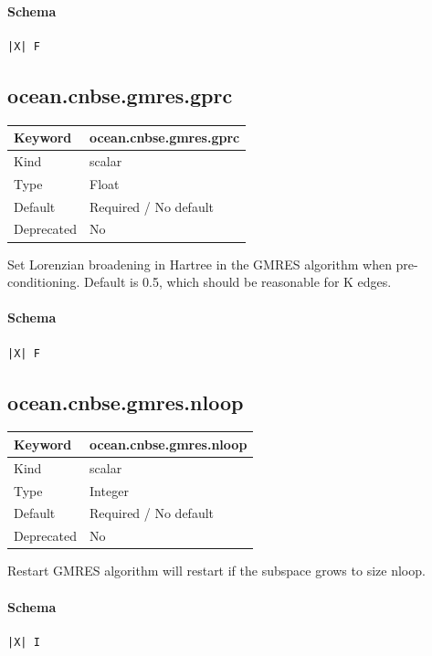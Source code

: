 \documentclass[11pt]{article}
\begin{document}
{{{{{\paragraph{Schema}
\begin{Verbatim}
|X| F
\end{Verbatim}

\subsection{ocean.cnbse.gmres.gprc}
\label{kw:ocean-cnbse-gmres-gprc}
\begin{longtable}{|p{1.5in}|p{4.5in}|}
\hline
Keyword & ocean.cnbse.gmres.gprc \\
\hline
Kind & scalar \\
\hline
Type & Float \\
\hline
Default & Required / No default \\
\hline
Deprecated & No \\
\hline
\end{longtable}
 Set Lorenzian broadening in Hartree in the GMRES algorithm when
 pre-conditioning. Default is 0.5, which should be reasonable for K edges.

\paragraph{Schema}
\begin{Verbatim}
|X| F
\end{Verbatim}

\subsection{ocean.cnbse.gmres.nloop}
\label{kw:ocean-cnbse-gmres-nloop}
\begin{longtable}{|p{1.5in}|p{4.5in}|}
\hline
Keyword & ocean.cnbse.gmres.nloop \\
\hline
Kind & scalar \\
\hline
Type & Integer \\
\hline
Default & Required / No default \\
\hline
Deprecated & No \\
\hline
\end{longtable}
 Restart GMRES algorithm will restart if the subspace grows to size nloop.

\paragraph{Schema}
\begin{Verbatim}
|X| I
\end{Verbatim}

}}}}}
\end{document}
